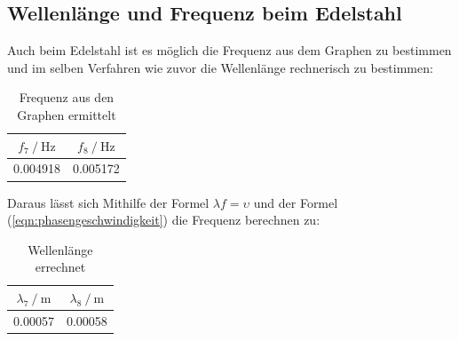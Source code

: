     \subsection{Wellenlänge und Frequenz beim Edelstahl}
    Auch beim Edelstahl ist es möglich die Frequenz aus dem Graphen zu bestimmen und im selben Verfahren wie zuvor die Wellenlänge rechnerisch zu bestimmen:
\begin{table}
        \centering
            \begin{tabular}{c c}
            \toprule
            {$ f_7 \mathbin{/} \si{\hertz} $}
            & {$ f_8 \mathbin{/} \si{\hertz} $} \\
            \midrule
            0.004918 & 0.005172 \\
            \bottomrule
            \end{tabular}
        \caption{Frequenz aus den Graphen ermittelt}
        \label{tab:MesWellen}
    \end{table}

    Daraus lässt sich Mithilfe der Formel $\lambda f = \upsilon$ und der Formel (\ref{eqn:phasengeschwindigkeit}) die Frequenz berechnen zu:
\begin{table}
        \centering
            \begin{tabular}{c c}
            \toprule
            {$   \lambda_7 \mathbin{/} \si{\meter} $}
            & {$ \lambda_8 \mathbin{/} \si{\meter} $} \\
            \midrule
            0.00057 & 0.00058 \\
            \bottomrule
            \end{tabular}
        \caption{Wellenlänge errechnet}
        \label{tab:MesWellene}
    \end{table}